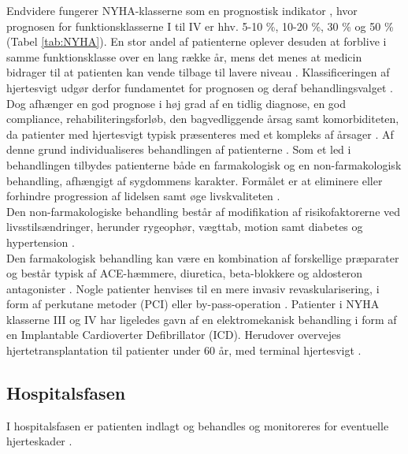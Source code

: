 Endvidere fungerer NYHA-klasserne som en prognostisk indikator \citep{Hjerteinsufficiens}, hvor prognosen for funktionsklasserne I til IV er hhv. 5-10 \%, 10-20 \%, 30 \% og 50 \% (Tabel \ref{tab:NYHA})\citep{sundhedprognoser}. En stor andel af patienterne oplever desuden at forblive i samme funktionsklasse over en lang række år, mens det menes at medicin bidrager til at patienten kan vende tilbage til lavere niveau \citep{Hjerteinsufficiens}.  
Klassificeringen af hjertesvigt udgør derfor fundamentet for prognosen og deraf behandlingsvalget \citep{DCS} \citep{EdokHjertesvigt}. Dog afhænger en god prognose i høj grad af en tidlig diagnose, en god compliance, rehabiliteringsforløb, den bagvedliggende årsag samt komorbiditeten, da patienter med hjertesvigt typisk præsenteres med et kompleks af årsager \citep{sstpakke}. Af denne grund individualiseres behandlingen af patienterne \citep{TSchroeder2016} \citep{sstpakke}. Som et led i behandlingen tilbydes patienterne både en farmakologisk og en non-farmakologisk behandling, afhængigt af sygdommens karakter. Formålet er at eliminere eller forhindre progression af lidelsen samt øge livskvaliteten \citep{sstpakke}.\\
Den non-farmakologiske behandling består af modifikation af risikofaktorerne ved livsstilsændringer, herunder rygeophør, vægttab, motion samt diabetes og hypertension \citep{Hjerteinsufficiens}.\\
Den farmakologisk behandling kan være en kombination af forskellige præparater og består typisk af ACE-hæmmere, diuretica, beta-blokkere og aldosteron antagonister \citep{TSchroeder2016}\citep{sstpakke}. Nogle patienter henvises til en mere invasiv revaskularisering, i form af perkutane metoder (PCI) eller by-pass-operation \citep{sstpakke}. Patienter i NYHA klasserne III og IV har ligeledes gavn af en elektromekanisk behandling i form af en Implantable Cardioverter Defibrillator (ICD). Herudover overvejes hjertetransplantation til patienter under 60 år, med terminal hjertesvigt \citep{EdokHjertesvigt}\citep{Hjerteinsufficiens}.

\subsection{Hospitalsfasen}
I hospitalsfasen er patienten indlagt og behandles og monitoreres for eventuelle hjerteskader \citep{Gheorghiade2009}.


